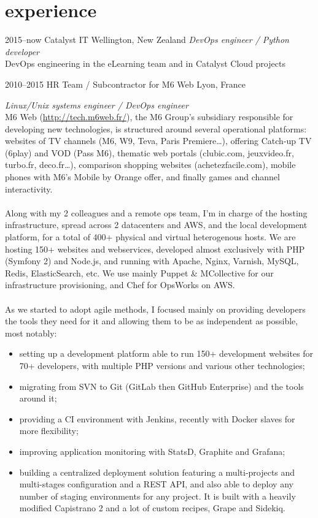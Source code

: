 \documentclass[]{friggeri-cv} %
\begin{document}
\section{experience}

\begin{entrylist}
\entry
{2015--now}
{Catalyst IT}
{Wellington, New Zealand}
{\emph{DevOps engineer / Python developer} \\
DevOps engineering in the eLearning team and in Catalyst Cloud projects}

\entry
{2010--2015}
{HR Team / Subcontractor for M6 Web}
{Lyon, France}
{\emph{Linux/Unix systems engineer / DevOps engineer} \\
M6 Web (\url{http://tech.m6web.fr/}), the M6 Group’s subsidiary responsible for developing new technologies, is structured around several operational platforms: websites of TV channels (M6, W9, Teva, Paris Premiere\dots), offering Catch-up TV (6play) and VOD (Pass M6), thematic web portals (clubic.com, jeuxvideo.fr, turbo.fr, deco.fr\dots), comparison shopping websites (achetezfacile.com), mobile phones with M6’s Mobile by Orange offer, and finally games and channel interactivity. \\
\\
Along with my 2 colleagues and a remote ops team, I'm in charge of the hosting infrastructure, spread across 2 datacenters and AWS, and the local development platform, for a total of 400+ physical and virtual heterogenous hosts. We are hosting 150+ websites and webservices, developed almost exclusively with PHP (Symfony 2) and Node.js, and running with Apache, Nginx, Varnish, MySQL, Redis, ElasticSearch, etc. We use mainly Puppet \& MCollective for our infrastructure provisioning, and Chef for OpsWorks on AWS. \\
\\
As we started to adopt agile methods, I focused mainly on providing developers the tools they need for it and allowing them to be as independent as possible, most notably:
\begin{itemize}
  \item setting up a development platform able to run 150+ development websites for 70+ developers, with multiple PHP versions and various other technologies;
  \item migrating from SVN to Git (GitLab then GitHub Enterprise) and the tools around it;
  \item providing a CI environment with Jenkins, recently with Docker slaves for more flexibility;
  \item improving application monitoring with StatsD, Graphite and Grafana;
  \item building a centralized deployment solution featuring a multi-projects and multi-stages configuration and a REST API, and also able to deploy any number of staging environments for any project. It is built with a heavily modified Capistrano 2 and a lot of custom recipes, Grape and Sidekiq.
\end{itemize}}


\end{entrylist}
\end{document}
